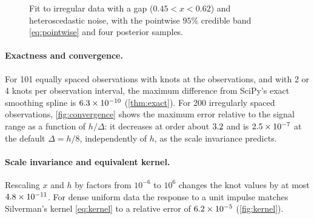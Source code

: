 \documentclass[11pt,a4paper]{article}
\theoremstyle{definition}
\theoremstyle{remark}
\begin{document}
\begin{figure}[t]
\centering
{}
\caption{Fit to irregular data with a gap ($0.45<x<0.62$) and heteroscedastic noise, with the pointwise $95\%$ credible band \eqref{eq:pointwise} and four posterior samples.}
\label{fig:fit}
\end{figure}

\paragraph{Exactness and convergence.} For 101 equally spaced observations with knots at the observations, and with 2 or 4 knots per observation interval, the maximum difference from SciPy's exact smoothing spline \citep[\texttt{make\_smoothing\_spline}]{Virtanen2020} is $6.3\times 10^{-10}$ (\cref{thm:exact}). For 200 irregularly spaced observations, \cref{fig:convergence} shows the maximum error relative to the signal range as a function of $h/\Delta$: it decreases at order about $3.2$ and is $2.5\times 10^{-7}$ at the default $\Delta=h/8$, independently of $h$, as the scale invariance predicts.

\paragraph{Scale invariance and equivalent kernel.} Rescaling $x$ and $h$ by factors from $10^{-6}$ to $10^6$ changes the knot values by at most $4.8\times 10^{-11}$. For dense uniform data the response to a unit impulse matches Silverman's kernel \eqref{eq:kernel} to a relative error of $6.2\times 10^{-5}$ (\cref{fig:kernel}).
\end{document}
